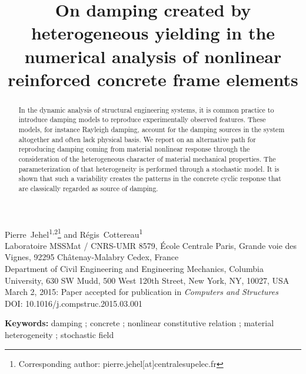\documentclass[12p]{amsart}
\title[]{On damping created by heterogeneous yielding in the numerical analysis of nonlinear reinforced concrete frame elements}
\date{}
\begin{document}
\maketitle

\renewcommand*{\thefootnote}{\fnsymbol{footnote}}

\begin{center}
Pierre~Jehel\textsuperscript{1,2}\footnote{Corresponding author: pierre.jehel[at]centralesupelec.fr} and R\'egis~Cottereau\textsuperscript{1} \\
\vspace{0.5cm}
 Laboratoire MSSMat / CNRS-UMR 8579, \'Ecole Centrale Paris, Grande voie des Vignes, 92295 Ch\^atenay-Malabry Cedex, France\\
 Department of Civil Engineering and Engineering Mechanics, Columbia University, 630 SW Mudd, 500 West 120th Street, New York, NY, 10027, USA \\
\vspace{0.5cm}
\small{March 2, 2015: Paper accepted for publication in \emph{Computers and Structures}} \\
\small{DOI: 10.1016/j.compstruc.2015.03.001}
\end{center}

\renewcommand*{\thefootnote}{\arabic{footnote}}

\begin{abstract}
In the dynamic analysis of structural engineering systems, it is common practice to introduce damping models to reproduce experimentally observed features. These models, for instance Rayleigh damping, account for the damping sources in the system altogether and often lack physical basis. We report on an alternative path for reproducing damping coming from material nonlinear response through the consideration of the heterogeneous character of material mechanical properties. The parameterization of that heterogeneity is performed through a stochastic model. It is shown that such a variability creates the patterns in the concrete cyclic response that are classically regarded as source of damping.
\end{abstract}

\noindent\textbf{Keywords:} damping ; concrete ; nonlinear constitutive relation ; material heterogeneity ; stochastic field
\end{document}
